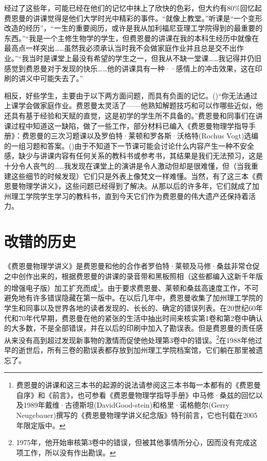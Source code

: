 \documentclass[UTF8, 12pt, a4paper, twoside]{ctexbook}
\begin{document}
经过了这些年，可能已经在他们的记忆中抹上了欣快的色彩，但大约有80\%回忆起费恩曼的讲课觉得是他们大学时光中精彩的事件。“就像上教堂。”听课是“一个变形改造的经历”，“一生的重要阅历，或许是我从加利福尼亚理工学院得到的最重要的东西。”“我是一个主修生物学的学生，但费恩曼的讲课在我的本科生经历中就像在最高点一样突出……虽然我必须承认当时我不会做家庭作业并且总是交不出作业。”“我当时是课堂上最没有希望的学生之一，但我从不缺一堂课……我记得并仍旧感觉到费恩曼对于发现的快乐……他的讲课具有一种··感情上的冲击效果，这在印刷的讲义中可能失去了。”

相反，好些学生，主要由于以下两方面问题，而具有负面的记忆。()“你无法通过上课学会做家庭作业。费恩曼太灵活了——他熟知解题技巧和可以作哪些近似，他还具有基于经验和天赋的直觉，这是初学的学生所不具备的。”费恩曼和同事们在讲课过程中知道这一缺陷，做了一些工作，部分材料已编入《费恩曼物理学指导手册》：费恩曼的三次习题课以及罗伯特·莱顿和罗各斯·沃格特(Rochus Vogt)选编的一组习题和答案。()由于不知道下一节课可能会讨论什么内容产生一种不安全感，缺少与讲课内容有任何关系的教科书或参考书，其结果是我们无法预习，这是十分令人丧气的……我发现在课堂上的演讲是令人激动但却是很难懂，但（当我重建这些细节的时候发现）它们只是外表上像梵文一样难懂。当然，有了这三本《费恩曼物理学讲义》，这些问题已经得到了解决。从那以后的许多年，它们就成了加州理工学院学生学习的教科书，直到今天它们作为费恩曼的伟大遗产还保持着活力。

\section*{改错的历史}

《费恩曼物理学讲义》是费恩曼和他的合作者罗伯特·莱顿及马修·桑兹非常仓促之中创作出来的，根据费恩曼的讲课的录音带和黑板照相（这些都编入这新千年版的增强电子版）加工扩充而成\footnote{费恩曼的讲课和这三本书的起源的说法请参阅这三本书每一本都有的《费恩曼自序》和《前言》，也可参看《费恩曼物理学指导手册》中马修·桑兹的回忆以及1989年戴维·古德斯坦(DavidGood-stein)和格里·诺格鲍尔(Gerry Neugebauer)撰写的《费恩曼物理学讲义纪念版》特刊前言，它也刊载在2005年限定版中。}。由于要求费恩曼、莱顿和桑兹高速度工作，不可避免地有许多错误隐藏在第一版中。在以后几年中，费恩曼收集了加州理工学院的学生和同事以及世界各地的读者发现的、长长的、确定的错误列表。在20世纪60年代和70年代早期，费恩曼在他的紧张的生活中抽出时间来核实第1卷和第2卷中确认的大多数，不是全部错误，并在以后的印刷中加入了勘误表。但是费恩曼的责任感从来没有高到超过发现新事物的激情而促使他处理第3卷中的错误。\footnote{1975年，他开始审核第3卷中的错误，但被其他事情所分心，因而没有完成这项工作，所以没有作出勘误。}在1988年他过早的逝世后，所有三卷的勘误表都存放到加州理工学院档案馆，它们躺在那里被遗忘了。
\end{document}

